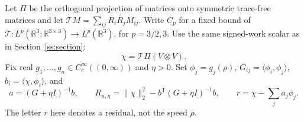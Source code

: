 Let $\Pi$ be the orthogonal projection of matrices onto symmetric
trace-free matrices and let $\mathcal T M=\sum_{ij}R_iR_jM_{ij}$.
Write $C_p$ for a fixed bound of $\mathcal T:L^p(\mathbb R^3;
\mathbb R^{3\times3})\to L^p(\mathbb R^3)$, for $p=3/2,3$.
Use the same signed-work scalar as in Section~\ref{ss:section}:
\[
 \chi=\mathcal T\Pi(V\otimes V).
\]
Fix real $g_1,\ldots,g_n\in C_c^\infty((0,\infty))$ and $\eta>0$.
Set $\phi_j=g_j(\rho)$, $G_{ij}=\langle\phi_i,\phi_j\rangle$,
$b_i=\langle\chi,\phi_i\rangle$, and
\begin{equation}\label{st:ridge-definition}
 a=(G+\eta I)^{-1}b,\qquad
 R_{n,\eta}=\|\chi\|_2^2-b^{\mathsf T}(G+\eta I)^{-1}b,
 \qquad r=\chi-\sum_j a_j\phi_j.
\end{equation}
The letter $r$ here denotes a residual, not the speed $\rho$.

